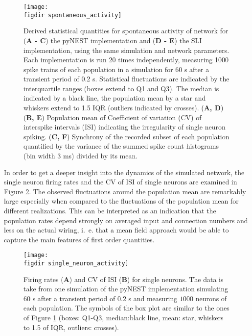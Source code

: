 \begin{figure}[htpb]
    \centering
    \texttt{[image: \\figdir spontaneous\_activity]}
    \caption{
        Derived statistical quantities for spontaneous activity of network for
        (\textbf{A - C}) the pyNEST implementation and (\textbf{D - E}) the SLI implementation, 
        using the same simulation and network parameters.
        Each implementation is run $20$ times independently, 
        measuring 1000 spike trains of each population in a simulation for 60 s 
        after a transient period of 0.2 s. 
        Statistical fluctuations 
        are indicated by the interquartile ranges (boxes extend to Q1 and Q3). 
        The median is indicated by a black line, the population mean by a star and 
        whiskers extend to 1.5 IQR (outliers indicated by crosses). 
        \quad (\textbf{A, D}) 
        \quad (\textbf{B, E}) Population mean of Coefficient of variation (CV) of interspike intervals (ISI) indicating 
        the irregularity of single neuron spiking. 
        \quad (\textbf{C, F}) Synchrony of the recorded subset of each population quantified by the 
        variance of the summed spike count histograms (bin width 3 ms) divided by
        its mean. 
    }
    \label{fig:spontaneous_activity}
\end{figure}

In order to get a deeper insight into the dynamics of the simulated network, the single neuron firing 
rates and the CV of ISI of single neurons are examined in Figure \ref{fig:single_neuron_activity}.
The observed fluctuations around the population mean are remarkably large especially when compared 
to the fluctuations of the population mean for different realizations. This can be interpreted as 
an indication that the population rates depend strongly on averaged input and connection numbers
and less on the actual wiring, i.~e. that a mean field approach would be able to capture the main features 
of first order quantities. 
\begin{figure}[htpb]
    \centering
    \texttt{[image: \\figdir single\_neuron\_activity]}
    \caption{
        Firing rates (\textbf{A}) and CV of ISI (\textbf{B}) for single neurons. 
        The data is take from one simulation of the pyNEST implementation 
        simulating $60$ s after a transient period of 0.2 s and measuring 
        $1000$ neurons of each population. The symbols of the box plot 
        are similar to the ones of Figure \ref{fig:spontaneous_activity} 
        (boxes: Q1-Q3, median:black line, mean: star, 
        whiskers to 1.5 of IQR, outliers: crosses). 
    }
    \label{fig:single_neuron_activity}
\end{figure}

